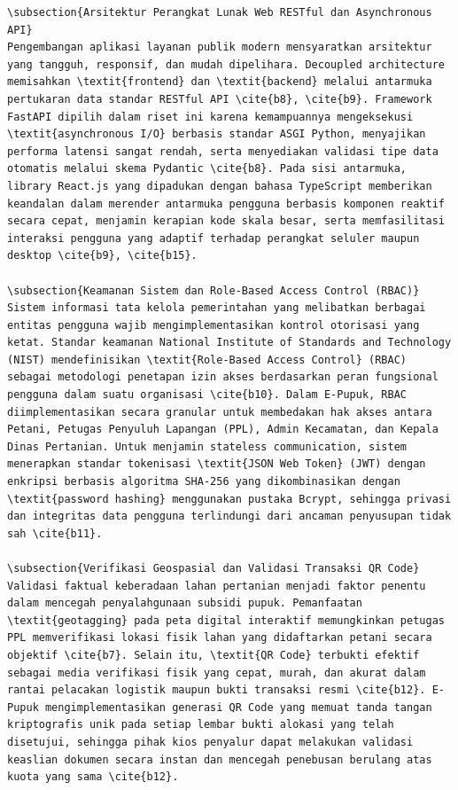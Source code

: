 \documentclass[conference]{IEEEtran}
\begin{document}
\begin{lstlisting}
\subsection{Arsitektur Perangkat Lunak Web RESTful dan Asynchronous API}
Pengembangan aplikasi layanan publik modern mensyaratkan arsitektur yang tangguh, responsif, dan mudah dipelihara. Decoupled architecture memisahkan \textit{frontend} dan \textit{backend} melalui antarmuka pertukaran data standar RESTful API \cite{b8}, \cite{b9}. Framework FastAPI dipilih dalam riset ini karena kemampuannya mengeksekusi \textit{asynchronous I/O} berbasis standar ASGI Python, menyajikan performa latensi sangat rendah, serta menyediakan validasi tipe data otomatis melalui skema Pydantic \cite{b8}. Pada sisi antarmuka, library React.js yang dipadukan dengan bahasa TypeScript memberikan keandalan dalam merender antarmuka pengguna berbasis komponen reaktif secara cepat, menjamin kerapian kode skala besar, serta memfasilitasi interaksi pengguna yang adaptif terhadap perangkat seluler maupun desktop \cite{b9}, \cite{b15}.

\subsection{Keamanan Sistem dan Role-Based Access Control (RBAC)}
Sistem informasi tata kelola pemerintahan yang melibatkan berbagai entitas pengguna wajib mengimplementasikan kontrol otorisasi yang ketat. Standar keamanan National Institute of Standards and Technology (NIST) mendefinisikan \textit{Role-Based Access Control} (RBAC) sebagai metodologi penetapan izin akses berdasarkan peran fungsional pengguna dalam suatu organisasi \cite{b10}. Dalam E-Pupuk, RBAC diimplementasikan secara granular untuk membedakan hak akses antara Petani, Petugas Penyuluh Lapangan (PPL), Admin Kecamatan, dan Kepala Dinas Pertanian. Untuk menjamin stateless communication, sistem menerapkan standar tokenisasi \textit{JSON Web Token} (JWT) dengan enkripsi berbasis algoritma SHA-256 yang dikombinasikan dengan \textit{password hashing} menggunakan pustaka Bcrypt, sehingga privasi dan integritas data pengguna terlindungi dari ancaman penyusupan tidak sah \cite{b11}.

\subsection{Verifikasi Geospasial dan Validasi Transaksi QR Code}
Validasi faktual keberadaan lahan pertanian menjadi faktor penentu dalam mencegah penyalahgunaan subsidi pupuk. Pemanfaatan \textit{geotagging} pada peta digital interaktif memungkinkan petugas PPL memverifikasi lokasi fisik lahan yang didaftarkan petani secara objektif \cite{b7}. Selain itu, \textit{QR Code} terbukti efektif sebagai media verifikasi fisik yang cepat, murah, dan akurat dalam rantai pelacakan logistik maupun bukti transaksi resmi \cite{b12}. E-Pupuk mengimplementasikan generasi QR Code yang memuat tanda tangan kriptografis unik pada setiap lembar bukti alokasi yang telah disetujui, sehingga pihak kios penyalur dapat melakukan validasi keaslian dokumen secara instan dan mencegah penebusan berulang atas kuota yang sama \cite{b12}.


\end{lstlisting}
\end{document}
